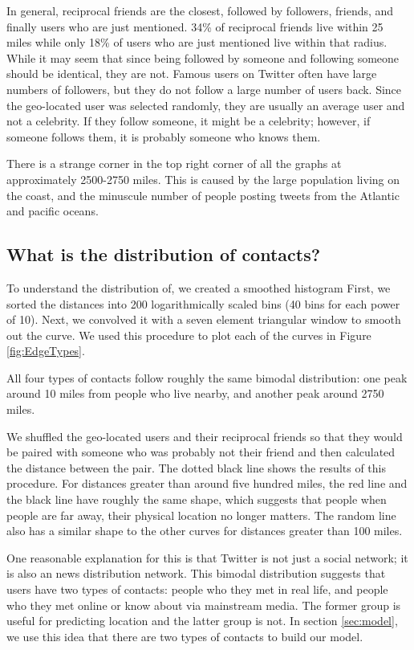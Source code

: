 \documentclass{sig-alternate}
\begin{document}
In general, reciprocal friends are the closest, followed by followers, friends,
and finally users who are just mentioned.
34\% of reciprocal friends live within 25 miles while only 18\% of users who are
just mentioned live within that radius.
While it may seem that since being followed by someone and following someone
should be identical, they are not.
Famous users on Twitter often have large numbers of followers, but they do not
follow a large number of users back.
Since the geo-located user was selected randomly, they are usually an average
user and not a celebrity.
If they follow someone, it might be a celebrity; however, if someone follows
them, it is probably someone who knows them.

There is a strange corner in the top right corner of all the graphs at
approximately 2500-2750 miles. This is caused by the large population living on the
coast, and the minuscule number of people posting tweets from the Atlantic and
pacific oceans.

\subsection{What is the distribution of contacts?}
To understand the distribution of, we created a smoothed histogram 
First, we sorted the distances into 200 logarithmically scaled bins (40 bins for each power of 10). Next, we convolved it with a seven element triangular window to smooth out the curve.
We used this procedure to plot each of the curves in Figure \ref{fig:EdgeTypes}.

All four types of contacts follow roughly the same bimodal distribution:
one peak around 10 miles from people who live nearby, and another peak around
2750 miles.

We shuffled the geo-located users and their reciprocal friends so that they
would be paired with someone who was probably not their friend and then
calculated the distance between the pair.
The dotted black line
shows the results of this procedure. For distances greater than around five
hundred miles, the red line and the black line have roughly the same shape,
which suggests that people when people are far away, their physical location no
longer matters.
The random line also has a similar shape to the other curves for distances
greater than 100 miles.

One reasonable explanation for this is that Twitter is not just a social
network; it is also an news distribution network.  This bimodal distribution
suggests that users have two types of contacts: people who they met in
real life, and people who they met online or know about via mainstream media.
The former group is useful for predicting location and the latter group is not.
In section \ref{sec:model}, we use this idea that there are two types of
contacts to build our model.
\end{document}
